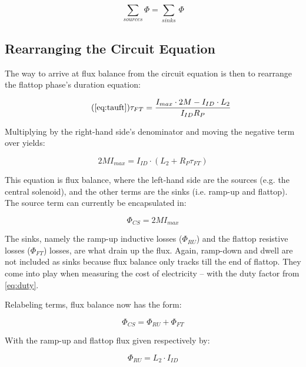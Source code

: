 \begin{equation}
	\sum_{sources} \Phi = \sum_{sinks} \, \Phi
\end{equation}

\subsection{Rearranging the Circuit Equation}

The way to arrive at flux balance from the circuit equation is then to rearrange the flattop phase's duration equation:

\begin{equation}
	\tag{\ref{eq:tauft}}
	\tau_{FT} = \frac{ I_{max} \cdot 2 M - I_{ID} \cdot  L_2 }{I_{ID} R_P}
\end{equation}

Multiplying by the right-hand side's denominator and moving the negative term over yields:

\begin{equation}
	2 M I_{max} = I_{ID} \cdot \left( L_2 + R_P \tau_{FT} \right) 
\end{equation}

This equation is flux balance, where the left-hand side are the sources (e.g. the central solenoid), and the other terms are the sinks (i.e. ramp-up and flattop). The source term can currently be encapsulated in:

\begin{equation}
	\label{eq:phics}
	\Phi_{CS} = 2 M I_{max}
\end{equation}

The sinks, namely the ramp-up inductive losses ($\Phi_{RU}$) and the flattop resistive losses ($\Phi_{FT}$) losses, are what drain up the flux. Again, ramp-down and dwell are not included as sinks because flux balance only tracks till the end of flattop. They come into play when measuring the cost of electricity -- with the duty factor from \cref{eq:duty}.

Relabeling terms, flux balance now has the form:

\begin{equation}
	\Phi_{CS} = \Phi_{RU} + \Phi_{FT}
\end{equation}

With the ramp-up and flattop flux given respectively by:

\begin{equation}
	\label{eq:phiru}
	\Phi_{RU} = L_2 \cdot I_{ID}
\end{equation}

